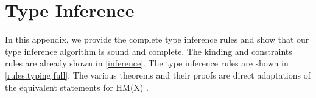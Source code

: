 
\section{Type Inference}
\label{appendix:infer}

\begin{figure*}[!btp]
  
  \caption{Type inference rules -- $\inferW{\Sigma}{(C,\psi)}{\bf{\E}}{\bf{e}}{\tau}$ }
  \label{rules:typing:full}
\end{figure*}

In this appendix, we provide the complete type inference rules
and show that our type inference algorithm is sound and complete.
The kinding and constraints rules are already shown in \cref{inference}.
The type inference rules are shown in \cref{rules:typing:full}.
The various theorems and their proofs are direct adaptations
of the equivalent statements for HM(X) \citep{sulzmann1997proofs}.





